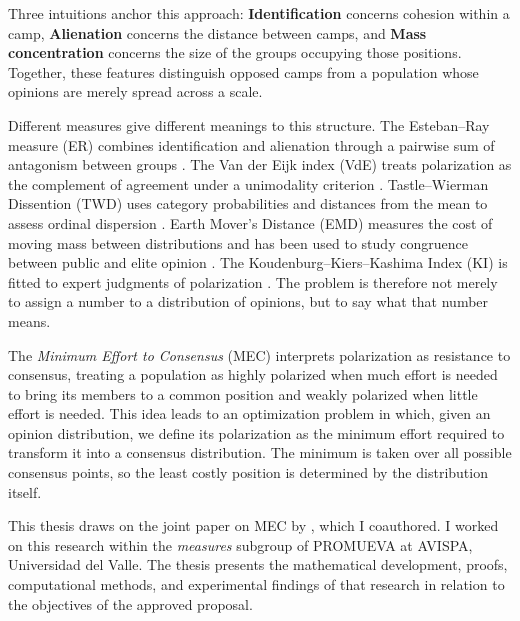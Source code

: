 \documentclass{article}
\theoremstyle{plain}
\theoremstyle{remark}
\begin{document}
Three intuitions anchor this approach: \textbf{Identification} concerns cohesion within a camp, \textbf{Alienation} concerns the distance between camps, and \textbf{Mass concentration} concerns the size of the groups occupying those positions. Together, these features distinguish opposed camps from a population whose opinions are merely spread across a scale.

Different measures give different meanings to this structure. The Esteban--Ray measure (ER) combines identification and alienation through a pairwise sum of antagonism between groups \citep{esteban1994measurement}. The Van der Eijk index (VdE) treats polarization as the complement of agreement under a unimodality criterion \citep{van2001measuring}. Tastle--Wierman Dissention (TWD) uses category probabilities and distances from the mean to assess ordinal dispersion \citep{tastle2007consensus}. Earth Mover's Distance (EMD) measures the cost of moving mass between distributions and has been used to study congruence between public and elite opinion \citep{lupu2017new}. The Koudenburg--Kiers--Kashima Index (KI) is fitted to expert judgments of polarization \citep{koudenburg2021new}. The problem is therefore not merely to assign a number to a distribution of opinions, but to say what that number means.

The \emph{Minimum Effort to Consensus} (MEC) interprets polarization as resistance to consensus, treating a population as highly polarized when much effort is needed to bring its members to a common position and weakly polarized when little effort is needed. This idea leads to an optimization problem in which, given an opinion distribution, we define its polarization as the minimum effort required to transform it into a consensus distribution. The minimum is taken over all possible consensus points, so the least costly position is determined by the distribution itself.

This thesis draws on the joint paper on MEC by \citet{aranda2026mec}, which I coauthored. I worked on this research within the \emph{measures} subgroup of PROMUEVA at AVISPA, Universidad del Valle. The thesis presents the mathematical development, proofs, computational methods, and experimental findings of that research in relation to the objectives of the approved proposal.
\end{document}
